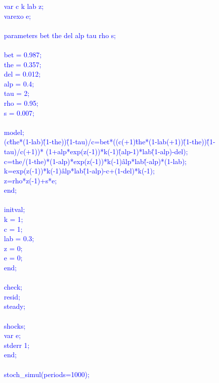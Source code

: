 \documentclass[a4paper,12pt]{scrartcl} %
\begin{document}
  \textcolor{blue}{var c k lab z;}\\
  \textcolor{blue}{varexo e;}\\
  ~~~~~~~~\\
  \textcolor{blue}{parameters bet the del alp tau rho s;}\\
  ~~~~~~~~\\
  \textcolor{blue}{bet = 0.987;}\\
  \textcolor{blue}{the = 0.357;}\\
  \textcolor{blue}{del = 0.012;}\\
  \textcolor{blue}{alp = 0.4;}\\
  \textcolor{blue}{tau = 2;}\\
  \textcolor{blue}{rho = 0.95;}\\
  \textcolor{blue}{s = 0.007;}\\
  ~~~~~~~~\\
  \textcolor{blue}{model;}\\
  \textcolor{blue}{(c\^the*(1-lab)\^(1-the))\^(1-tau)/c=bet*((c(+1)\^the*(1-lab(+1))\^(1-the))\^(1-tau)/c(+1))*
(1+alp*exp(z(-1))*k(-1)\^(alp-1)*lab\^(1-alp)-del);}\\
  \textcolor{blue}{c=the/(1-the)*(1-alp)*exp(z(-1))*k(-1)\^alp*lab\^(-alp)*(1-lab);}\\
  \textcolor{blue}{k=exp(z(-1))*k(-1)\^alp*lab\^(1-alp)-c+(1-del)*k(-1);}\\
  \textcolor{blue}{z=rho*z(-1)+s*e;}\\
  \textcolor{blue}{end;}\\
  ~~~~~~~~\\
  \textcolor{blue}{initval;}\\
  \textcolor{blue}{k = 1;}\\
  \textcolor{blue}{c = 1;}\\
  \textcolor{blue}{lab = 0.3;}\\
  \textcolor{blue}{z = 0;}\\
  \textcolor{blue}{e = 0;}\\
  \textcolor{blue}{end;}\\
  ~~~~~~~~\\
  \textcolor{blue}{check;}\\
  \textcolor{blue}{resid;}\\
  \textcolor{blue}{steady;}\\
  ~~~~~~~~\\
  \textcolor{blue}{shocks;}\\
  \textcolor{blue}{var e;}\\
  \textcolor{blue}{stderr 1;}\\
  \textcolor{blue}{end;}\\
  ~~~~~~~~\\
  \textcolor{blue}{stoch\_simul(periods=1000);}\\
\end{document}
